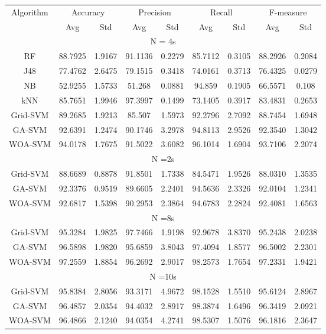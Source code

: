 \begin{table}[htbp]
\centering
\begin{tabular}{|c|c|c|c|c|c|c|c|c|}\hline
\multirow{2}{*}{Algorithm} & \multicolumn{2}{c|}{Accuracy} & \multicolumn{2}{c|}{Precision} & \multicolumn{2}{c|}{Recall} & \multicolumn{2}{c|}{F-measure} \\ \cline{2-9}
  & Avg & Std & Avg & Std & Avg & Std & Avg & Std \\ \hline
\multicolumn{9}{|c|}{N = 4s} \\ \hline
RF & 88.7925 & 1.9167 & 91.1136 & 0.2279 & 85.7112 & 0.3105 & 88.2926 & 0.2084 \\ \hline
J48 & 77.4762 & 2.6475 & 79.1515 & 0.3418 & 74.0161 & 0.3713 & 76.4325 & 0.0279 \\ \hline
NB & 52.9255 & 1.5733 & 51.268 & 0.0881 & 94.859 & 0.1905 & 66.5571 & 0.108 \\ \hline
kNN & 85.7651 & 1.9946 & 97.3997 & 0.1499 & 73.1405 & 0.3917 & 83.4831 & 0.2653 \\ \hline
Grid-SVM & 89.2685 & 1.9213 & 85.507 & 1.5973 & 92.2796 & 2.7092 & 88.7454 & 1.6948 \\ \hline
GA-SVM & 92.6391 & 1.2474 & 90.1746 & 3.2978 & 94.8113 & 2.9526 & 92.3540 & 1.3042 \\ \hline
WOA-SVM & 94.0178 & 1.7675 & 91.5022 & 3.6082 & 96.1014 & 1.6904 & 93.7106 & 2.2074 \\ \hline
\multicolumn{9}{|c|}{N =2s} \\ \hline
Grid-SVM & 88.6689 & 0.8878 & 91.8501 & 1.7338 & 84.5471 & 1.9526 & 88.0310 & 1.3535 \\ \hline
GA-SVM & 92.3376 & 0.9519 & 89.6605 & 2.2401 & 94.5636 & 2.3326 & 92.0104 & 1.2341 \\ \hline
WOA-SVM & 92.6817 & 1.5398 & 90.2953 & 2.3864 & 94.6783 & 2.2824 & 92.4081 & 1.6563 \\ \hline
\multicolumn{9}{|c|}{N =8s} \\ \hline
Grid-SVM & 95.3284 & 1.9825 & 97.7466 & 1.9198 & 92.9678 & 3.8370 & 95.2438 & 2.0238 \\ \hline
GA-SVM & 96.5898 & 1.9820 & 95.6859 & 3.8043 & 97.4094 & 1.8577 & 96.5002 & 2.2301 \\ \hline
WOA-SVM & 97.2559 & 1.8854 & 96.2692 & 2.9017 & 98.2573 & 1.7654 & 97.2331 & 1.9421 \\ \hline
\multicolumn{9}{|c|}{N =10s} \\ \hline
Grid-SVM & 95.8384 & 2.8056 & 93.3171 & 4.9672 & 98.1528 & 1.5510 & 95.6124 & 2.8967 \\ \hline
GA-SVM & 96.4857 & 2.0354 & 94.4032 & 2.8917 & 98.3874 & 1.6496 & 96.3419 & 2.0921 \\ \hline
WOA-SVM & 96.4866 & 2.1240 & 94.0354 & 4.2741 & 98.5307 & 1.5076 & 96.1816 & 2.3647 \\ \hline
\end{tabular}\end{table}

